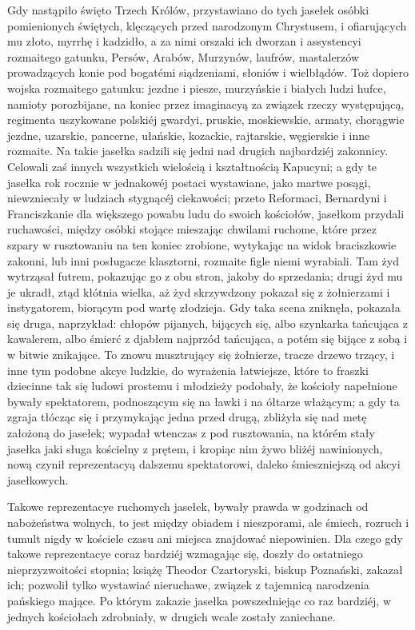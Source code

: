 \documentclass{book}
\begin{document}
Gdy nastąpiło święto Trzech Królów, przystawiano do tych jasełek osóbki pomienionych świętych, klęczących przed narodzonym Chrystusem, i ofiarujących mu złoto, myrrhę i kadzidło, a za nimi orszaki ich dworzan i assystencyi rozmaitego gatunku, Persów, Arabów, Murzynów, laufrów, mastalerzów prowadzących konie pod bogatémi siądzeniami, słoniów i wielbłądów. Toż dopiero wojska rozmaitego gatunku: jezdne i piesze, murzyńskie i białych ludzi hufce, namioty porozbijane, na koniec przez imaginacyą za związek rzeczy występującą, regimenta uszykowane polskiéj gwardyi, pruskie, moskiewskie, armaty, chorągwie jezdne, uzarskie, pancerne, ułańskie, kozackie, rajtarskie, węgierskie i inne rozmaite. Na takie jasełka sadzili się jedni nad drugich najbardziéj zakonnicy. Celowali zaś innych wszystkich wielością i kształtnością Kapucyni; a gdy te jasełka rok rocznie w jednakowéj postaci wystawiane, jako martwe posągi, niewzniecały w ludziach stygnącéj ciekawości; przeto Reformaci, Bernardyni i Franciszkanie dla większego powabu ludu do swoich kościołów, jasełkom przydali ruchawości, między osóbki stojące mieszając chwilami ruchome, które przez szpary w rusztowaniu na ten koniec zrobione, wytykając na widok braciszkowie zakonni, lub inni posługacze klasztorni, rozmaite figle niemi wyrabiali. Tam żyd wytrząsał futrem, pokazując go z obu stron, jakoby do sprzedania; drugi żyd mu je ukradł, ztąd kłótnia wielka, aż żyd skrzywdzony pokazał się z żołnierzami i instygatorem, biorącym pod wartę złodzieja. Gdy taka scena zniknęła, pokazała się druga, naprzykład: chłopów pijanych, bijących się, albo szynkarka tańcująca z kawalerem, albo śmierć z djabłem najprzód tańcująca, a potém się bijące z sobą i w bitwie znikające. To znowu musztrujący się żołnierze, tracze drzewo trzący, i inne tym podobne akcye ludzkie, do wyrażenia łatwiejsze, które to fraszki dziecinne tak się ludowi prostemu i młodzieży podobały, że kościoły napełnione bywały spektatorem, podnoszącym się na ławki i na ółtarze włażącym; a gdy ta zgraja tłócząc się i przymykając jedna przed drugą, zbliżyła się nad metę założoną do jasełek; wypadał wtenczas z pod rusztowania, na którém stały jasełka jaki sługa kościelny z prętem, i kropiąc nim żywo bliżéj nawinionych, nową czynił reprezentacyą dalszemu spektatorowi, daleko śmieszniejszą od akcyi jasełkowych.

Takowe reprezentacye ruchomych jasełek, bywały prawda w godzinach od nabożeństwa wolnych, to jest między obiadem i nieszporami, ale śmiech, rozruch i tumult nigdy w kościele czasu ani miejsca znajdować niepowinien. Dla czego gdy takowe reprezentacye coraz bardziéj wzmagając się, doszły do ostatniego nieprzyzwoitości stopnia; książę Theodor Czartoryski, biskup Poznański, zakazał ich; pozwolił tylko wystawiać nieruchawe, związek z tajemnicą narodzenia pańskiego mające. Po którym zakazie jasełka powszedniejąc co raz bardziéj, w jednych kościołach zdrobniały, w drugich wcale zostały zaniechane.
\end{document}
